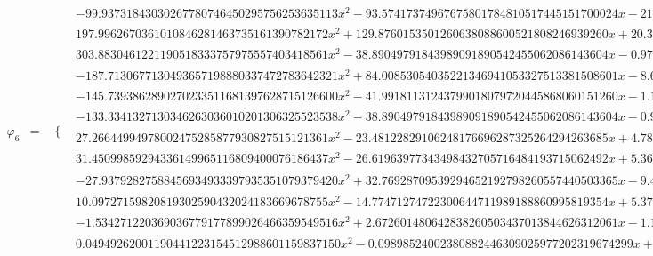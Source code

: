 \documentclass{article}
\begin{document}
\begin{landscape}
\begin{eqnarray*}
\begin{array}{cc}
\end{array}\\
\varphi_6 & = & \begin{array}{cc}
 \{ & 
\begin{array}{cc}
 -99.93731843030267780746450295756253635113 x^2-93.57417374967675801784810517445151700024 x-21.58134890715514267062720292474048077011 & x\geq -\frac{1}{2}\land x<-\frac{3}{8} \\
 197.9962670361010846281463735161390782172 x^2+129.8760153501260638088600521808246939260 x+20.31556154905788642188057657937380877857 & x\geq -\frac{3}{8}\land x<-\frac{1}{4} \\
 303.8830461221190518333757975557403418561 x^2-38.89049791843989091890542455062086143604 x-0.9740846966377391229583442563106193964771 & x\geq 0\land x<\frac{1}{8} \\
 -187.7130677130493657198880337472783642321 x^2+84.00853054035221346941053327513381508601 x-8.655273975312245647228091620420286679105 & x\geq \frac{1}{8}\land x<\frac{1}{4} \\
 -145.7393862890270233511681397628715126600 x^2-41.99181131243799018079720445868060151260 x-1.167916783762620326826580500564353151262 & x\geq -\frac{1}{4}\land x<-\frac{1}{8} \\
 -133.3341327130346263036010201306325523538 x^2-38.89049791843989091890542455062086143604 x-0.9740846966377391229583442563106193964771 & x\geq -\frac{1}{8}\land x<0 \\
 27.26644994978002475285877930827515121361 x^2-23.48122829106248176696287325264294263685 x+4.780945878614591257318584195551808036252 & x\geq \frac{1}{4}\land x<\frac{3}{8} \\
 31.45099859294336149965116809400076186437 x^2-26.61963977343498432705716484193715062492 x+5.369398031559435487336263868544472034015 & x\geq \frac{3}{8}\land x<\frac{1}{2} \\
 -27.93792827588456934933397935351079379420 x^2+32.76928709539294652192798260557440503365 x-9.477833685647547224910022993333416880628 & x\geq \frac{1}{2}\land x<\frac{5}{8} \\
 10.09727159820819302590432024183669678755 x^2-14.77471274722300644711989188860995819354 x+5.379666265169938077917437786099196627869 & x\geq \frac{5}{8}\land x<\frac{3}{4} \\
 -1.534271220369036779177899026466359549516 x^2+2.672601480642838260503437013844626312061 x-1.163076570279753687441310552321272561730 & x\geq \frac{3}{4}\land x<\frac{7}{8} \\
 0.04949262001190441223154512988601159837150 x^2-0.09898524002380882446309025977202319674299 x+0.04949262001190441223154512988601159837150 & x\geq \frac{7}{8}\land x<1 \\

\end{array}
\end{array}
\end{eqnarray*}
\end{landscape}
\end{document}
